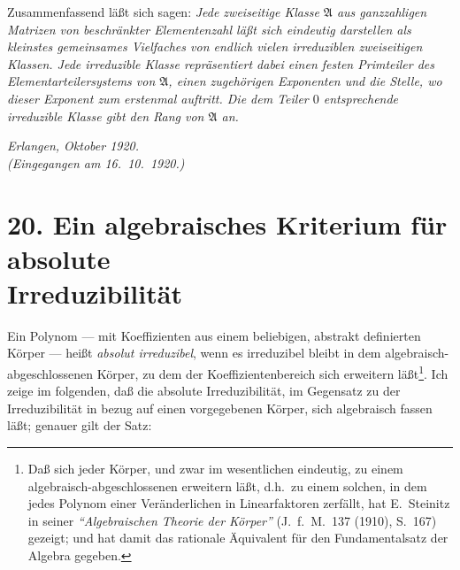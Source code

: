 \documentclass[fontsize=10pt,paper=a5,pagesize,headings=small]{scrbook}
\newcommand{\ideal}[1]{\mathfrak{#1}}
\theoremstyle{plain}
\begin{document}
Zusammenfassend läßt sich sagen: \textit{Jede zweiseitige Klasse $\ideal{A}$ aus
ganzzahligen Matrizen von beschränkter Elementenzahl läßt sich eindeutig
darstellen als kleinstes gemeinsames Vielfaches von endlich vielen irreduziblen
zweiseitigen Klassen. Jede irreduzible Klasse repräsentiert dabei einen festen
Primteiler des Elementarteilersystems von $\ideal{A}$, einen zugehörigen Exponenten
und die Stelle, wo dieser Exponent zum erstenmal auftritt. Die dem Teiler
$0$ entsprechende irreduzible Klasse gibt den Rang von $\ideal{A}$ an.}

\vfill
\begin{flushright}
\textit{Erlangen, Oktober 1920.}\\[4pt]
\textit{(Eingegangen am 16.\ 10.\ 1920.)}
\end{flushright}

\newpage

\section*{20. Ein algebraisches Kriterium für absolute\\Irreduzibilität\footnotemark[0]}


\setcounter{page}{411}

Ein Polynom --- mit Koeffizienten aus einem beliebigen, abstrakt definierten
Körper --- heißt \textit{absolut irreduzibel}, wenn es irreduzibel bleibt in dem
algebraisch-abgeschlossenen Körper, zu dem der Koeffizientenbereich sich erweitern
läßt\footnote{Daß sich jeder Körper, und zwar im wesentlichen eindeutig, zu einem
algebraisch-abgeschlossenen erweitern läßt, d.h.~zu einem solchen, in dem jedes Polynom
einer Veränderlichen in Linearfaktoren zerfällt, hat E.~Steinitz in seiner
\textit{``Algebraischen Theorie der Körper''} (J.~f.~M.\ 137 (1910), S.~167) gezeigt;
und hat damit das rationale Äquivalent für den Fundamentalsatz der Algebra gegeben.}.
Ich zeige im folgenden, daß die absolute Irreduzibilität, im Gegensatz zu der
Irreduzibilität in bezug auf einen vorgegebenen Körper, sich algebraisch fassen
läßt; genauer gilt der Satz:
\end{document}
